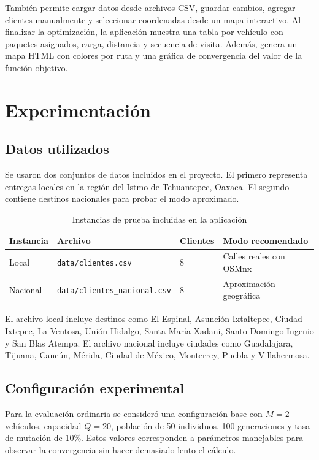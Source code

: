 \documentclass[runningheads]{llncs}
\begin{document}
También permite cargar datos desde archivos CSV, guardar cambios, agregar clientes manualmente y seleccionar coordenadas desde un mapa interactivo. Al finalizar la optimización, la aplicación muestra una tabla por vehículo con paquetes asignados, carga, distancia y secuencia de visita. Además, genera un mapa HTML con colores por ruta y una gráfica de convergencia del valor de la función objetivo.

\section{Experimentación}

\subsection{Datos utilizados}

Se usaron dos conjuntos de datos incluidos en el proyecto. El primero representa entregas locales en la región del Istmo de Tehuantepec, Oaxaca. El segundo contiene destinos nacionales para probar el modo aproximado.

\begin{table}
\centering
\caption{Instancias de prueba incluidas en la aplicación}
\begin{tabular}{llll}
\toprule
Instancia & Archivo & Clientes & Modo recomendado \\
\midrule
Local & \texttt{data/clientes.csv} & 8 & Calles reales con OSMnx \\
Nacional & \texttt{data/clientes\_nacional.csv} & 8 & Aproximación geográfica \\
\bottomrule
\end{tabular}
\end{table}

El archivo local incluye destinos como El Espinal, Asunción Ixtaltepec, Ciudad Ixtepec, La Ventosa, Unión Hidalgo, Santa María Xadani, Santo Domingo Ingenio y San Blas Atempa. El archivo nacional incluye ciudades como Guadalajara, Tijuana, Cancún, Mérida, Ciudad de México, Monterrey, Puebla y Villahermosa.

\subsection{Configuración experimental}

Para la evaluación ordinaria se consideró una configuración base con $M=2$ vehículos, capacidad $Q=20$, población de 50 individuos, 100 generaciones y tasa de mutación de 10\%. Estos valores corresponden a parámetros manejables para observar la convergencia sin hacer demasiado lento el cálculo.
\end{document}
